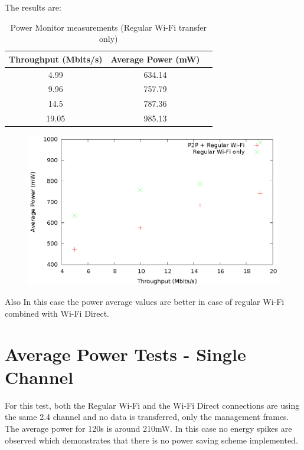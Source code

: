 The results are:

\begin{table}[h!]
  \centering
  \caption{Power Monitor measurements (Regular Wi-Fi transfer only)}
  \label{tab:table1}
  \begin{tabular}{ccc}
    \toprule
    Throughput (Mbits/s) & Average Power (mW) \\
    \midrule
     4.99 & 634.14 \\
     9.96 & 757.79 \\
     14.5 & 787.36 \\
     19.05 & 985.13 \\
    \bottomrule
  \end{tabular}
\end{table}

\begin{figure}[bp!]
\includegraphics{src/img/powervaluesparallel.eps}
\end{figure}

Also In this case the power average values are better in case of regular Wi-Fi combined with Wi-Fi Direct.

\section{Average Power Tests - Single Channel}
\label{sec:nexus5-consumption}

For this test, both the Regular Wi-Fi and the Wi-Fi Direct connections are using the same 2.4 channel and no data is transferred, only the management frames. The average power for 120s is around 210mW. In this case no energy spikes are observed which demonstrates that there is no power saving scheme implemented.


